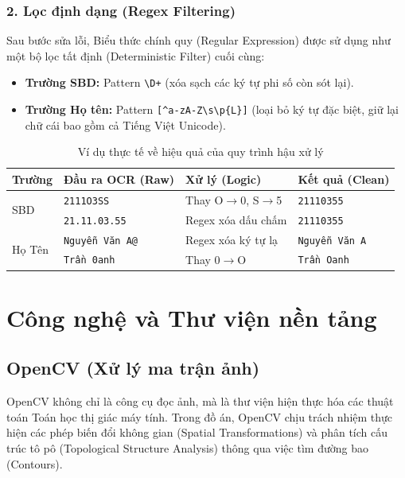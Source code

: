 \documentclass[6pt, a4paper]{report}
\begin{document}
	\subsubsection{2. Lọc định dạng (Regex Filtering)}
	Sau bước sửa lỗi, Biểu thức chính quy (Regular Expression) được sử dụng như một bộ lọc tất định (Deterministic Filter) cuối cùng:
	\begin{itemize}
		\item \textbf{Trường SBD:} Pattern \texttt{\textbackslash D+} (xóa sạch các ký tự phi số còn sót lại).
		\item \textbf{Trường Họ tên:} Pattern \texttt{[\^{}a-zA-Z\textbackslash s\textbackslash p\{L\}]} (loại bỏ ký tự đặc biệt, giữ lại chữ cái bao gồm cả Tiếng Việt Unicode).
	\end{itemize}
	
	\begin{table}[H]
		\centering
		\caption{Ví dụ thực tế về hiệu quả của quy trình hậu xử lý}
		\begin{tabular}{|l|l|l|l|}
			\hline
			\textbf{Trường} & \textbf{Đầu ra OCR (Raw)} & \textbf{Xử lý (Logic)} & \textbf{Kết quả (Clean)} \\ \hline
			\multirow{2}{*}{SBD} & \texttt{2111O3SS} & Thay O$\rightarrow$0, S$\rightarrow$5 & \texttt{21110355} \\ \cline{2-4} 
			& \texttt{21.11.03.55} & Regex xóa dấu chấm & \texttt{21110355} \\ \hline
			\multirow{2}{*}{Họ Tên} & \texttt{Nguyễn Văn A@} & Regex xóa ký tự lạ & \texttt{Nguyễn Văn A} \\ \cline{2-4} 
			& \texttt{Trần 0anh} & Thay 0$\rightarrow$O & \texttt{Trần Oanh} \\ \hline
		\end{tabular}
		\label{tab:post_processing}
	\end{table}
	
	\section{Công nghệ và Thư viện nền tảng}
	
	\subsection{OpenCV (Xử lý ma trận ảnh)}
	OpenCV không chỉ là công cụ đọc ảnh, mà là thư viện hiện thực hóa các thuật toán Toán học thị giác máy tính. Trong đồ án, OpenCV chịu trách nhiệm thực hiện các phép biến đổi không gian (Spatial Transformations) và phân tích cấu trúc tô pô (Topological Structure Analysis) thông qua việc tìm đường bao (Contours).
	
\end{document}
